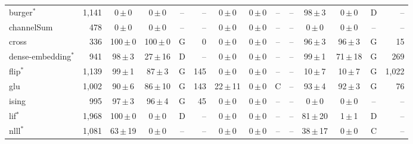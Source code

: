 \begin{figure}[!t]
\begin{tabular}{lr|c|c|cr|c|c|cr|c|c|cr}
burger$^{*}$ & 1{,}141 & \phantom{00}0\,$\pm$\,\phantom{0}0 & \phantom{00}0\,$\pm$\,\phantom{0}0 & -- & -- & \phantom{00}0\,$\pm$\,\phantom{0}0 & \phantom{00}0\,$\pm$\,\phantom{0}0 & -- & -- & \phantom{0}98\,$\pm$\,\phantom{0}3 & \phantom{00}0\,$\pm$\,\phantom{0}0 & \textsf{D} & -- \\
channelSum & 478 & \phantom{00}0\,$\pm$\,\phantom{0}0 & \phantom{00}0\,$\pm$\,\phantom{0}0 & -- & -- & \phantom{00}0\,$\pm$\,\phantom{0}0 & \phantom{00}0\,$\pm$\,\phantom{0}0 & -- & -- & \phantom{00}0\,$\pm$\,\phantom{0}0 & \phantom{00}0\,$\pm$\,\phantom{0}0 & -- & -- \\
cross & 336 & 100\,$\pm$\,\phantom{0}0 & 100\,$\pm$\,\phantom{0}0 & \textsf{G} & 0 & \phantom{00}0\,$\pm$\,\phantom{0}0 & \phantom{00}0\,$\pm$\,\phantom{0}0 & -- & -- & \phantom{0}96\,$\pm$\,\phantom{0}3 & \phantom{0}96\,$\pm$\,\phantom{0}3 & \textsf{G} & 15 \\
dense-embedding$^{*}$ & 941 & \phantom{0}98\,$\pm$\,\phantom{0}3 & \phantom{0}27\,$\pm$\,16 & \textsf{D} & -- & \phantom{00}0\,$\pm$\,\phantom{0}0 & \phantom{00}0\,$\pm$\,\phantom{0}0 & -- & -- & \phantom{0}99\,$\pm$\,\phantom{0}1 & \phantom{0}71\,$\pm$\,18 & \textsf{G} & 269 \\
flip$^{*}$ & 1{,}139 & \phantom{0}99\,$\pm$\,\phantom{0}1 & \phantom{0}87\,$\pm$\,\phantom{0}3 & \textsf{G} & 145 & \phantom{00}0\,$\pm$\,\phantom{0}0 & \phantom{00}0\,$\pm$\,\phantom{0}0 & -- & -- & \phantom{0}10\,$\pm$\,\phantom{0}7 & \phantom{0}10\,$\pm$\,\phantom{0}7 & \textsf{G} & 1{,}022 \\
glu & 1{,}002 & \phantom{0}90\,$\pm$\,\phantom{0}6 & \phantom{0}86\,$\pm$\,10 & \textsf{G} & 143 & \phantom{0}22\,$\pm$\,11 & \phantom{00}0\,$\pm$\,\phantom{0}0 & \textsf{C} & -- & \phantom{0}93\,$\pm$\,\phantom{0}4 & \phantom{0}92\,$\pm$\,\phantom{0}3 & \textsf{G} & 76 \\
ising & 995 & \phantom{0}97\,$\pm$\,\phantom{0}3 & \phantom{0}96\,$\pm$\,\phantom{0}4 & \textsf{G} & 45 & \phantom{00}0\,$\pm$\,\phantom{0}0 & \phantom{00}0\,$\pm$\,\phantom{0}0 & -- & -- & \phantom{00}0\,$\pm$\,\phantom{0}0 & \phantom{00}0\,$\pm$\,\phantom{0}0 & -- & -- \\
lif$^{*}$ & 1{,}968 & 100\,$\pm$\,\phantom{0}0 & \phantom{00}0\,$\pm$\,\phantom{0}0 & \textsf{D} & -- & \phantom{00}0\,$\pm$\,\phantom{0}0 & \phantom{00}0\,$\pm$\,\phantom{0}0 & -- & -- & \phantom{0}81\,$\pm$\,20 & \phantom{00}1\,$\pm$\,\phantom{0}1 & \textsf{D} & -- \\
nlll$^{*}$ & 1{,}081 & \phantom{0}63\,$\pm$\,19 & \phantom{00}0\,$\pm$\,\phantom{0}0 & -- & -- & \phantom{00}0\,$\pm$\,\phantom{0}0 & \phantom{00}0\,$\pm$\,\phantom{0}0 & -- & -- & \phantom{0}38\,$\pm$\,17 & \phantom{00}0\,$\pm$\,\phantom{0}0 & \textsf{C} & -- \\

\end{tabular}
\end{figure}
